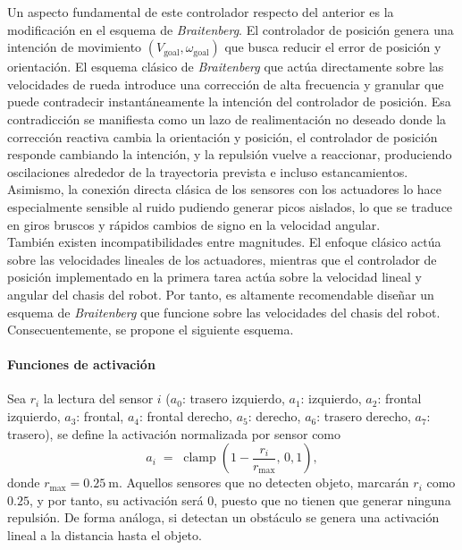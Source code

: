Un aspecto fundamental de este controlador respecto del anterior es la modificación
en el esquema de \textit{Braitenberg}. El controlador de posición genera una
intención de movimiento \((V_{\text{goal}},\omega_{\text{goal}})\) que busca reducir
el error de posición y orientación. El esquema clásico de \textit{Braitenberg} que 
actúa directamente sobre las velocidades de rueda introduce una corrección de alta
frecuencia y granular que puede contradecir instantáneamente la intención del
controlador de posición. Esa contradicción se manifiesta como un lazo de 
realimentación no deseado donde la corrección reactiva cambia la orientación y posición, 
el controlador de posición responde cambiando la intención, y la repulsión vuelve
a reaccionar, produciendo oscilaciones alrededor de la trayectoria prevista e incluso 
estancamientos. \\

Asimismo, la conexión directa clásica de los sensores con los actuadores lo hace 
especialmente sensible al ruido pudiendo generar picos aislados, lo que se traduce 
en giros bruscos y rápidos cambios de signo en la velocidad angular. \\

También existen incompatibilidades entre magnitudes. El enfoque clásico 
actúa sobre las velocidades lineales de los actuadores, mientras que el 
controlador de posición implementado en la primera tarea actúa sobre la 
velocidad lineal y angular del chasis del robot. Por tanto, es altamente 
recomendable diseñar un esquema de \textit{Braitenberg} que funcione 
sobre las velocidades del chasis del robot. \\

Consecuentemente, se propone el siguiente esquema.

\paragraph{Funciones de activación}
Sea \(r_i\) la lectura del sensor \(i\) ($a_0$: trasero izquierdo, $a_1$: izquierdo,
$a_2$: frontal izquierdo, $a_3$: frontal, $a_4$: frontal derecho,
$a_5$: derecho, $a_6$: trasero derecho, $a_7$: trasero), se define la activación
normalizada por sensor como
\begin{equation}
a_i \;=\; \operatorname{clamp}\!\left(1 - \frac{r_i}{r_{\max}},\,0,1\right),
\label{eq:act}
\end{equation}
donde \(r_{\max}=0.25\ \mathrm{m}\). Aquellos sensores que no detecten objeto, 
marcarán $r_i$ como $0.25$, y por tanto, su activación será $0$, puesto que no 
tienen que generar ninguna repulsión. De forma análoga, si detectan un obstáculo 
se genera una activación lineal a la distancia hasta el objeto.

